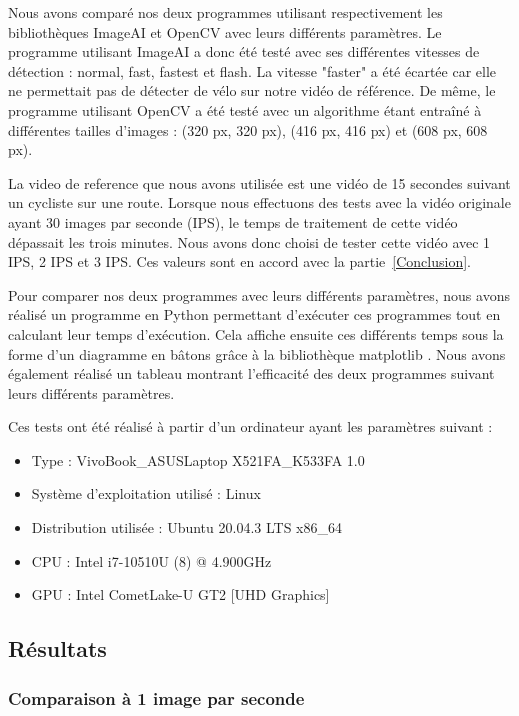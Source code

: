 Nous avons comparé nos deux programmes utilisant respectivement les bibliothèques ImageAI et OpenCV avec leurs différents paramètres.
Le programme utilisant ImageAI a donc été testé avec ses différentes vitesses de détection : normal, fast, fastest et flash.
La vitesse "faster" a été écartée car elle ne permettait pas de détecter de vélo sur notre vidéo de référence.
De même, le programme utilisant OpenCV a été testé avec un algorithme étant entraîné à différentes tailles d'images :
(320 px, 320 px), (416 px, 416 px) et (608 px, 608 px).

La \gls{video de reference} que nous avons utilisée est une vidéo de 15 secondes suivant un cycliste sur une route.
Lorsque nous effectuons des tests avec la vidéo originale ayant 30 images par seconde (IPS),
le temps de traitement de cette vidéo dépassait les trois minutes.
Nous avons donc choisi de tester cette vidéo avec 1 IPS, 2 IPS et 3 IPS.
Ces valeurs sont en accord avec la partie~\ref{Conclusion}.

Pour comparer nos deux programmes avec leurs différents paramètres, nous avons réalisé un programme en Python permettant
d'exécuter ces programmes tout en calculant leur temps d'exécution.
Cela affiche ensuite ces différents temps sous la forme d'un diagramme en bâtons grâce à la bibliothèque matplotlib \cite{matplotlib}.
Nous avons également réalisé un tableau montrant l'efficacité des deux programmes suivant leurs différents paramètres.

Ces tests ont été réalisé à partir d'un ordinateur ayant les paramètres suivant :
\begin{itemize}
    \item Type : VivoBook\_ASUSLaptop X521FA\_K533FA 1.0
    \item Système d'exploitation utilisé : Linux
    \item Distribution utilisée : Ubuntu 20.04.3 LTS x86\_64
    \item \gls{CPU} : Intel i7-10510U (8) @ 4.900GHz
    \item \gls{GPU} : Intel CometLake-U GT2 [UHD Graphics]
\end{itemize}

\subsection{Résultats}
\label{sec:comparaisonIA:resultats}

\subsubsection{Comparaison à 1 image par seconde}
\label{sec:comparaisonIA:resultats:1fps}

